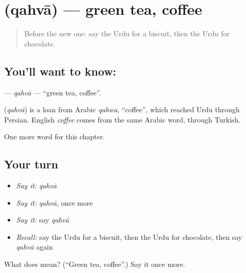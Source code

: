 \section[\texorpdfstring{\ur{قہوہ} (qahvā)}{قہوہ (qahvā)}]{ (qahvā) — green tea, coffee}

\label{lesson:UR-C118-qahva}



\begin{quote}
Before the new one: say the Urdu for a biscuit, then the Urdu for chocolate.
\end{quote}

\subsection*{You'll want to know: }
\textbf{} — \emph{qahvā} — \textquotedblleft{}green tea, coffee\textquotedblright{}.

\begin{cousinweb}
\textbf{} (\emph{qahvā}) is a loan from Arabic \emph{qahwa}, \textquotedblleft{}coffee\textquotedblright{}, which reached Urdu through Persian. English \emph{coffee} comes from the same Arabic word, through Turkish.
\end{cousinweb}

\begin{grammarlens}[title={What you've built}]
One more word for this chapter.
\end{grammarlens}

\subsection*{Your turn}
\begin{itemize}
\raggedright
  \item \emph{Say it:} \emph{qahvā}
  \item \emph{Say it:} \emph{qahvā}, once more
  \item \emph{Say it:} say \emph{qahvā}
  \item \emph{Recall:} say the Urdu for a biscuit, then the Urdu for chocolate, then say \emph{qahvā} again
\end{itemize}

\begin{tcolorbox}[breakable,colback=teal!4,colframe=teal!35!black,title={Before you move on}]
What does  mean? (\textquotedblleft{}Green tea, coffee\textquotedblright{}.) Say it once more.
\end{tcolorbox}
